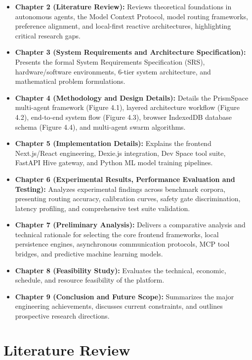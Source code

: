 \documentclass[12pt,a4paper]{report}
\begin{document}
\begin{itemize}
    \item \textbf{Chapter 2 (Literature Review):} Reviews theoretical foundations in autonomous agents, the Model Context Protocol, model routing frameworks, preference alignment, and local-first reactive architectures, highlighting critical research gaps.
    \item \textbf{Chapter 3 (System Requirements and Architecture Specification):} Presents the formal System Requirements Specification (SRS), hardware/software environments, 6-tier system architecture, and mathematical problem formulations.
    \item \textbf{Chapter 4 (Methodology and Design Details):} Details the PrismSpace multi-agent framework (Figure 4.1), layered architecture workflow (Figure 4.2), end-to-end system flow (Figure 4.3), browser IndexedDB database schema (Figure 4.4), and multi-agent swarm algorithms.
    \item \textbf{Chapter 5 (Implementation Details):} Explains the frontend Next.js/React engineering, Dexie.js integration, Dev Space tool suite, FastAPI Hive gateway, and Python ML model training pipelines.
    \item \textbf{Chapter 6 (Experimental Results, Performance Evaluation and Testing):} Analyzes experimental findings across benchmark corpora, presenting routing accuracy, calibration curves, safety gate discrimination, latency profiling, and comprehensive test suite validation.
    \item \textbf{Chapter 7 (Preliminary Analysis):} Delivers a comparative analysis and technical rationale for selecting the core frontend frameworks, local persistence engines, asynchronous communication protocols, MCP tool bridges, and predictive machine learning models.
    \item \textbf{Chapter 8 (Feasibility Study):} Evaluates the technical, economic, schedule, and resource feasibility of the platform.
    \item \textbf{Chapter 9 (Conclusion and Future Scope):} Summarizes the major engineering achievements, discusses current constraints, and outlines prospective research directions.
\end{itemize}


\chapter{Literature Review}
\end{document}
